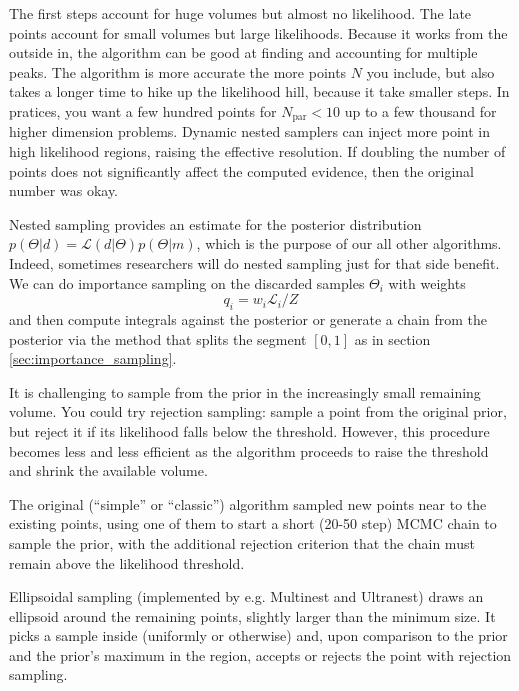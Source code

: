 The first steps account for huge volumes but almost no likelihood.  The late points account for small volumes but large likelihoods.  Because it works from the outside in, the algorithm can be good at finding and accounting for multiple peaks.  The algorithm is more accurate the more points $N$ you include, but also takes a longer time to hike up the likelihood hill, because it take smaller steps.  In pratices, you want a few hundred points for $N_\textrm{par} < 10$ up to a few thousand for higher dimension problems.  Dynamic nested samplers can inject more point in high likelihood regions, raising the effective resolution.  If doubling the number of points does not significantly affect the computed evidence, then the original number was okay.  

Nested sampling provides an estimate for the posterior distribution $p(\Theta| d) = \mathcal{L}(d|\Theta) p(\Theta|m)$, which is the purpose of our all other algorithms.   Indeed, sometimes researchers will do nested sampling just for that side benefit.  We can do importance sampling on the discarded samples $\Theta_i$ with weights
\begin{equation}
  q_i = w_i \mathcal{L}_i/Z
\end{equation}
and then compute integrals against the posterior or generate a chain from the posterior via the method that splits the segment $[0,1]$ as in section \ref{sec:importance_sampling}.

It is challenging to sample from the prior in the increasingly small remaining volume.  You could try rejection sampling: sample a point from the original prior, but reject it if its likelihood falls below the threshold.  However, this procedure becomes less and less efficient as the algorithm proceeds to raise the threshold and shrink the available volume.

The original (``simple'' or ``classic'') algorithm \citep{SiviaSkilling2006} sampled new points near to the existing points, using one of them to start a short (20-50 step) MCMC chain to sample the prior, with the additional rejection criterion that the chain must remain above the likelihood threshold.

Ellipsoidal sampling (implemented by e.g. Multinest and Ultranest) draws an ellipsoid around the remaining points, slightly larger than the minimum size.  It picks a sample inside (uniformly or otherwise) and, upon comparison to the prior and the prior's maximum in the region, accepts or rejects the point with rejection sampling.

